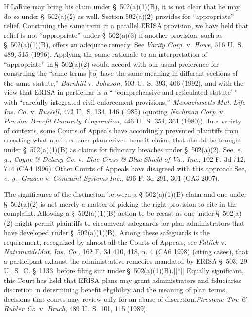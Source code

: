   If LaRue may bring his claim under \S~502(a)(1)(B), it is not clear that he may do so under \S~502(a)(2) as well. Section 502(a)(2) provides for ``appropriate'' relief. Construing the same term in a parallel ERISA provision, we have held that relief is not ``appropriate'' under \S~502(a)(3) if another provision, such as \S~502(a)(1)(B), offers an adequate remedy. See \emph{Varity Corp.} v. \emph{Howe,} 516 U.~S. 489, 515 (1996). Applying the same rationale to an interpretation of ``appropriate'' in \S~502(a)(2) would accord with our usual preference for construing the ``same terms [to] have the same meaning in different sections of the same statute,'' \emph{Barnhill} v. \emph{Johnson,} 503 U.~S. 393, 406 (1992), and with the view that ERISA in particular is a `` ‘comprehensive and reticulated statute' '' with ``carefully integrated civil enforcement provisions,'' \emph{Massachusetts Mut. Life Ins. Co.} v. \emph{Russell,} 473 U.~S. 134, 146 (1985) (quoting \emph{Nachman Corp.} v. \emph{Pension Benefit Guaranty Corporation,} 446 U.~S. 359, 361 (1980)). In a variety of contexts, some Courts of Appeals have accordingly prevented plaintiffs from recasting what are in essence planderived benefit claims that should be brought under \S~502(a)(1)(B) as claims for fiduciary breaches under \S~502(a)(2). See, \emph{e. g., Coyne \& Delany Co.} v. \emph{Blue Cross \& Blue Shield of Va., Inc.,} 102 F. 3d 712, 714 (CA4 1996). Other Courts of Appeals have disagreed with this approach.See, \emph{e. g., Graden} v. \emph{Conexant Systems Inc.,} 496 F. 3d 291, 301 (CA3 2007).

  The significance of the distinction between a \S~502(a)(1)(B) claim and one under \S~502(a)(2) is not merely a matter of picking the right provision to cite in the complaint. Allowing a \S~502(a)(1)(B) action to be recast as one under \S~502(a)(2) might permit plaintiffs to circumvent safeguards for plan administrators that have developed under \S~502(a)(1)(B). Among these safeguards is the requirement, recognized by almost all the Courts of Appeals, see \emph{Fallick} v. \emph{Nationwide\newpage Mut. Ins. Co.,} 162 F. 3d 410, 418, n. 4 (CA6 1998) (citing cases), that a participant exhaust the administrative remedies mandated by ERISA \S~503, 29 U.~S.~C. \S~1133, before filing suit under \S~502(a)(1)(B).[[*]] Equally significant, this Court has held that ERISA plans may grant administrators and fiduciaries discretion in determining benefit eligibility and the meaning of plan terms, decisions that courts may review only for an abuse of discretion.\emph{Firestone Tire \& Rubber Co.} v. \emph{Bruch,} 489 U.~S. 101, 115 (1989).

